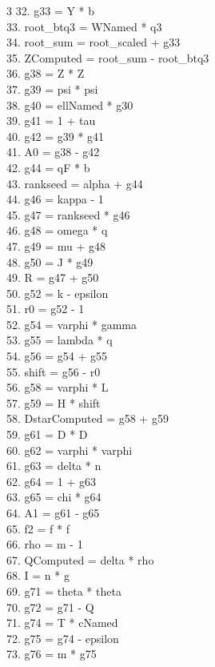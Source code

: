 \documentclass[10pt]{article}
\begin{document}
\begin{multicols}{3}
32. g33 = Y * b\\
33. root\_btq3 = WNamed * q3\\
34. root\_sum = root\_scaled + g33\\
35. ZComputed = root\_sum - root\_btq3\\
36. g38 = Z * Z\\
37. g39 = psi * psi\\
38. g40 = ellNamed * g30\\
39. g41 = 1 + tau\\
40. g42 = g39 * g41\\
41. A0 = g38 - g42\\
42. g44 = qF * b\\
43. rankseed = alpha + g44\\
44. g46 = kappa - 1\\
45. g47 = rankseed * g46\\
46. g48 = omega * q\\
47. g49 = mu + g48\\
48. g50 = J * g49\\
49. R = g47 + g50\\
50. g52 = k - epsilon\\
51. r0 = g52 - 1\\
52. g54 = varphi * gamma\\
53. g55 = lambda * q\\
54. g56 = g54 + g55\\
55. shift = g56 - r0\\
56. g58 = varphi * L\\
57. g59 = H * shift\\
58. DstarComputed = g58 + g59\\
59. g61 = D * D\\
60. g62 = varphi * varphi\\
61. g63 = delta * n\\
62. g64 = 1 + g63\\
63. g65 = chi * g64\\
64. A1 = g61 - g65\\
65. f2 = f * f\\
66. rho = m - 1\\
67. QComputed = delta * rho\\
68. I = n * g\\
69. g71 = theta * theta\\
70. g72 = g71 - Q\\
71. g74 = T * cNamed\\
72. g75 = g74 - epsilon\\
73. g76 = m * g75\\

\end{multicols}
\end{document}
